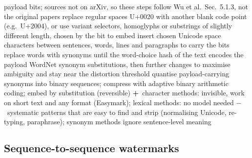 \documentclass[10pt,a4paper,twocolumn]{article}
\newcommand{\pro}[1]{\Statex\textcolor{proc}{\textbf{+}\ #1}}
\newcommand{\con}[1]{\Statex\textcolor{conc}{\textbf{$-$}\ #1}}
\begin{document}
\begin{algorithm}[H]\small
\caption{Classical character and lexical schemes (survey-level description only)}
\begin{algorithmic}[1]
\Require payload bits; sources not on arXiv, so these steps follow Wu et al.\ Sec.~5.1.3, not the original papers
 
 \State replace regular spaces U+0020 with another blank code point (e.g.\ U+2004), or use variant selectors, homoglyphs or substrings of slightly different length, chosen by the bit to embed
\EndProcedure
{} 
 \State insert chosen Unicode space characters between sentences, words, lines and paragraphs to carry the bits
\EndProcedure
{} 
 \State replace words with synonyms until the word-choice hash of the text encodes the payload
\EndProcedure
{} 
 \State WordNet synonym substitutions, then further changes to maximise ambiguity and stay near the distortion threshold
\EndProcedure
{} 
 \State quantise payload-carrying synonyms into binary sequences; compress with adaptive binary arithmetic coding; embed by substitution (reversible)
\EndProcedure
\pro{character methods: invisible, work on short text and any format (Easymark); lexical methods: no model needed}
\con{systematic patterns that are easy to find and strip (normalising Unicode, re-typing, paraphrase); synonym methods ignore sentence-level meaning}
\end{algorithmic}
\end{algorithm}

\subsection*{Sequence-to-sequence watermarks}
\end{document}
